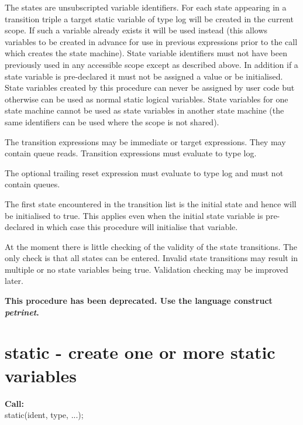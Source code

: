         The states are unsubscripted variable identifiers. For each state
        appearing in a transition triple a target static variable of type log
        will be created in the current scope. If such a variable already
        exists it will be used instead (this allows variables to be created
        in advance for use in previous expressions prior to the call which
        creates the state machine). State variable identifiers must not have
        been previously used in any accessible scope except as described
        above. In addition if a state variable is pre-declared it must not be
        assigned a value or be initialised. State variables created by this
        procedure can never be assigned by user code but otherwise can be
        used as normal static logical variables. State variables for one
        state machine cannot be used as state variables in another state
        machine (the same identifiers can be used where the scope is not
        shared).

        The transition expressions may be immediate or target expressions.
        They may contain queue reads. Transition expressions must evaluate to
        type log.

        The optional trailing reset expression must evaluate to type log
        and must not contain queues.

        The first state encountered in the transition list is the initial
        state and hence will be initialised to true. This applies even when
        the initial state variable is pre-declared in which case this
        procedure will initialise that variable.

        At the moment there is little checking of the validity of the state
        transitions. The only check is that all states can be entered.
        Invalid state transitions may result in multiple or no state
        variables being true. Validation checking may be improved later.
        
        {\bf This procedure has been deprecated. Use the language construct
        {\em petrinet}.}


    \section{static - create one or more static variables}\label{sec:ipstatic}
        
        {\bf Call:} \\
        static(ident, type, ...);
        
